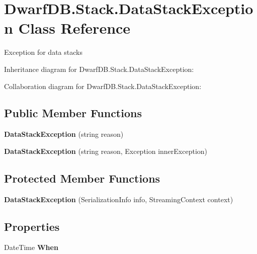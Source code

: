 \hypertarget{class_dwarf_d_b_1_1_stack_1_1_data_stack_exception}{\section{Dwarf\+D\+B.\+Stack.\+Data\+Stack\+Exception Class Reference}
\label{class_dwarf_d_b_1_1_stack_1_1_data_stack_exception}
}


Exception for data stacks  




Inheritance diagram for Dwarf\+D\+B.\+Stack.\+Data\+Stack\+Exception\+:


Collaboration diagram for Dwarf\+D\+B.\+Stack.\+Data\+Stack\+Exception\+:
\subsection*{Public Member Functions}
\begin{DoxyCompactItemize}
\item 
\hypertarget{class_dwarf_d_b_1_1_stack_1_1_data_stack_exception_a75bf91637eb6790f89577fe4dfb2cd66}{{\bfseries Data\+Stack\+Exception} (string reason)}\label{class_dwarf_d_b_1_1_stack_1_1_data_stack_exception_a75bf91637eb6790f89577fe4dfb2cd66}

\item 
\hypertarget{class_dwarf_d_b_1_1_stack_1_1_data_stack_exception_af6f022a09792030b2be0c07c87b9fe28}{{\bfseries Data\+Stack\+Exception} (string reason, Exception inner\+Exception)}\label{class_dwarf_d_b_1_1_stack_1_1_data_stack_exception_af6f022a09792030b2be0c07c87b9fe28}

\end{DoxyCompactItemize}
\subsection*{Protected Member Functions}
\begin{DoxyCompactItemize}
\item 
\hypertarget{class_dwarf_d_b_1_1_stack_1_1_data_stack_exception_a456baab589d0eb986f916b47ddd076d2}{{\bfseries Data\+Stack\+Exception} (Serialization\+Info info, Streaming\+Context context)}\label{class_dwarf_d_b_1_1_stack_1_1_data_stack_exception_a456baab589d0eb986f916b47ddd076d2}

\end{DoxyCompactItemize}
\subsection*{Properties}
\begin{DoxyCompactItemize}
\item 
\hypertarget{class_dwarf_d_b_1_1_stack_1_1_data_stack_exception_ab7fefbe501011036a2cc3d59ccb42cd8}{Date\+Time {\bfseries When}}\label{class_dwarf_d_b_1_1_stack_1_1_data_stack_exception_ab7fefbe501011036a2cc3d59ccb42cd8}

\end{DoxyCompactItemize}


